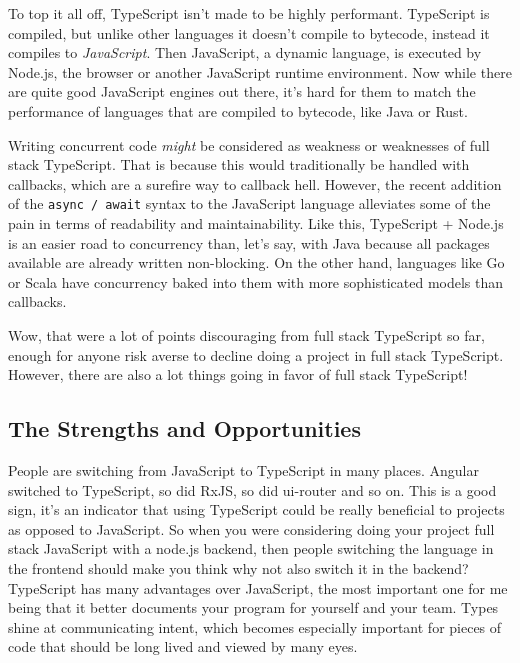 \documentclass[12pt,a4paper]{report}
\begin{document}
To top it all off, TypeScript isn't made to be highly performant. TypeScript is compiled, but unlike other languages it doesn't compile to bytecode, instead it compiles to \textit{JavaScript}. Then JavaScript, a dynamic language, is executed by Node.js, the browser or another JavaScript runtime environment. Now while there are quite good JavaScript engines out there, it's hard for them to match the performance of languages that are compiled to bytecode, like Java or Rust.

Writing concurrent code \textit{might} be considered as weakness or weaknesses of full stack TypeScript. That is because this would traditionally be handled with callbacks, which are a surefire way to callback hell. However, the recent addition of the \texttt{async / await} syntax to the JavaScript language alleviates some of the pain in terms of readability and maintainability. Like this, TypeScript + Node.js is an easier road to concurrency than, let's say, with Java because all packages available are already written non-blocking. On the other hand, languages like Go or Scala have concurrency baked into them with more sophisticated models than callbacks. 

Wow, that were a lot of points discouraging from full stack TypeScript so far, enough for anyone risk averse to decline doing a project in full stack TypeScript. However, there are also a lot things going in favor of full stack TypeScript!

\subsection{The Strengths and Opportunities}
People are switching from JavaScript to TypeScript in many places. Angular switched to TypeScript, so did RxJS, so did ui-router and so on. This is a good sign, it's an indicator that using TypeScript could be really beneficial to projects as opposed to JavaScript. So when you were considering doing your project full stack JavaScript with a node.js backend, then people switching the language in the frontend should make you think why not also switch it in the backend? TypeScript has many advantages over JavaScript, the most important one for me being that it better documents your program for yourself and your team. Types shine at communicating intent, which becomes especially important for pieces of code that should be long lived and viewed by many eyes.
\end{document}
